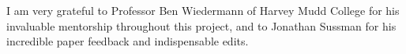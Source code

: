 \documentclass{article}
\begin{document}
\begin{acknowledgments}
I am very grateful to Professor Ben Wiedermann of Harvey Mudd College for his invaluable mentorship throughout this project, and to Jonathan Sussman for his incredible paper feedback and indispensable edits.
\end{acknowledgments} 


\balance %


\end{document}
